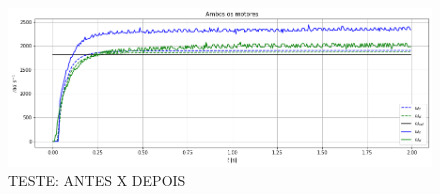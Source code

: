 \begin{figure}[H]
    \centering
    \includegraphics[width=13cm]{figuras/resultados/plot_test_antes_x_depois.png}
    \caption{TESTE: ANTES X DEPOIS}
\end{figure}
